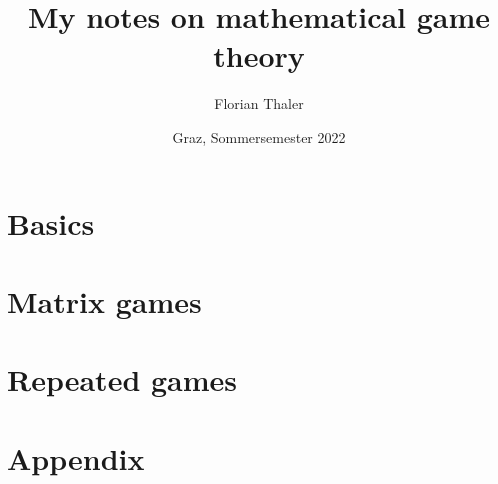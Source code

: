 \documentclass[
    a4paper,     %
        headsepline, %
        halfparskip,     %
        fleqn,       %
    10pt         %
    ]{scrartcl}  %
\title{My notes on mathematical game theory}
\author{Florian Thaler}
\date{Graz, Sommersemester 2022}
\theoremstyle{definition}
\theoremstyle{remark}
\theoremstyle{remark}
\begin{document}
    \maketitle

    \tableofcontents
    \newpage
    \section{Basics}
        
        \newpage

    \section{Matrix games}
        
        \newpage

    \section{Repeated games}
        
        \newpage

    \section{Appendix}
        
        \newpage

    
    
\end{document}
